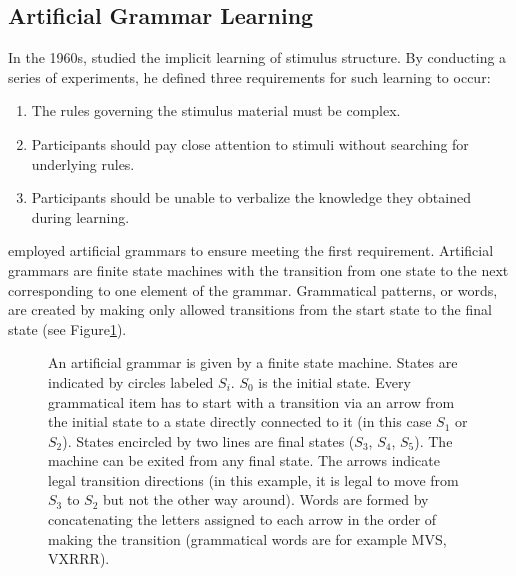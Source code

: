 \subsection{Artificial Grammar Learning}
In the 1960s, \citeauthor{reber1967implicit} studied the implicit learning of stimulus structure. By conducting a series of experiments, he defined three requirements \citep[p.~190]{reber1978analogic} for such learning to occur:
\begin{enumerate}
\item The rules governing the stimulus material must be complex.
\item Participants should pay close attention to stimuli without searching for underlying rules.
\item Participants should be unable to verbalize the knowledge they obtained during learning. 
\end{enumerate}
\citeauthor{reber1967implicit} employed artificial grammars to ensure meeting the first requirement. Artificial grammars are finite state machines with the transition from one state to the next corresponding to one element of the grammar. Grammatical patterns, or words, are created by making only allowed transitions from the start state to the final state (see Figure\ref{figure1}). 
\begin{figure}
\centering
{}
\caption{An artificial grammar is given by a finite state machine. States are indicated by circles labeled $S_{i}$. $S_{0}$ is the initial state. Every grammatical item has to start with a transition via an arrow from the initial state to a state directly connected to it (in this case $S_{1}$ or $S_{2}$). States encircled by two lines are final states ($S_{3}$, $S_{4}$, $S_{5}$). The machine can be exited from any final state. The arrows indicate legal transition directions (in this example, it is legal to move from $S_{3}$ to $S_{2}$ but not the other way around). Words are formed by concatenating the letters assigned to each arrow in the order of making the transition (grammatical words are for example MVS, VXRRR).} 
\label{figure1}
\end{figure}
